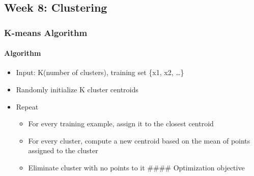 \documentclass[]{article}
\providecommand{\tightlist}{%
  \setlength{\itemsep}{0pt}\setlength{\parskip}{0pt}}
\let\oldparagraph\paragraph
\renewcommand{\paragraph}[1]{\oldparagraph{#1}\mbox{}}
\begin{document}
\hypertarget{week-8-clustering}{%
\subsection{Week 8: Clustering}\label{week-8-clustering}}

\hypertarget{k-means-algorithm}{%
\subsubsection{K-means Algorithm}\label{k-means-algorithm}}

\hypertarget{algorithm}{%
\paragraph{Algorithm}\label{algorithm}}

\begin{itemize}
\tightlist
\item
  Input: K(number of clusters), training set \{x1, x2, \ldots{}\}
\item
  Randomly initialize K cluster centroids
\item
  Repeat

  \begin{itemize}
  \tightlist
  \item
    For every training example, assign it to the closest centroid
  \item
    For every cluster, compute a new centroid based on the mean of
    points assigned to the cluster
  \item
    Eliminate cluster with no points to it \#\#\#\# Optimization
    objective
  \end{itemize}
\end{itemize}
\end{document}
